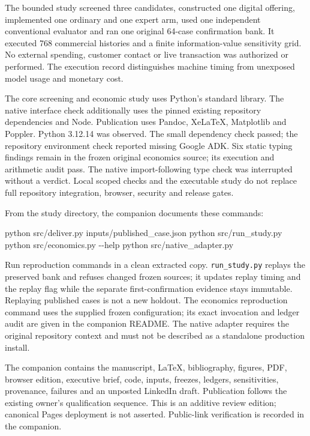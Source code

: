 \documentclass[
  11pt,
  letterpaper,
]{article}
\newenvironment{Shaded}{}{}
\newcommand{\AttributeTok}[1]{\textcolor[rgb]{0.49,0.56,0.16}{#1}}
\newcommand{\ExtensionTok}[1]{#1}
\newcommand{\NormalTok}[1]{#1}
\begin{document}
The bounded study screened three candidates, constructed one digital
offering, implemented one ordinary and one expert arm, used one
independent conventional evaluator and ran one original 64-case
confirmation bank. It executed 768 commercial histories and a finite
information-value sensitivity grid. No external spending, customer
contact or live transaction was authorized or performed. The execution
record distinguishes machine timing from unexposed model usage and
monetary cost.

The core screening and economic study uses Python's standard library.
The native interface check additionally uses the pinned existing
repository dependencies and Node. Publication uses Pandoc, XeLaTeX,
Matplotlib and Poppler. Python 3.12.14 was observed. The small
dependency check passed; the repository environment check reported
missing Google ADK. Six static typing findings remain in the frozen
original economics source; its execution and arithmetic audit pass. The
native import-following type check was interrupted without a verdict.
Local scoped checks and the executable study do not replace full
repository integration, browser, security and release gates.

From the study directory, the companion documents these commands:

\begin{Shaded}
\begin{Highlighting}[]
\ExtensionTok{python}\NormalTok{ src/deliver.py inputs/published\_case.json}
\ExtensionTok{python}\NormalTok{ src/run\_study.py}
\ExtensionTok{python}\NormalTok{ src/economics.py }\AttributeTok{{-}{-}help}
\ExtensionTok{python}\NormalTok{ src/native\_adapter.py}
\end{Highlighting}
\end{Shaded}

Run reproduction commands in a clean extracted copy.
\texttt{run\_study.py} replays the preserved bank and refuses changed
frozen sources; it updates replay timing and the replay flag while the
separate first-confirmation evidence stays immutable. Replaying
published cases is not a new holdout. The economics reproduction command
uses the supplied frozen configuration; its exact invocation and ledger
audit are given in the companion README. The native adapter requires the
original repository context and must not be described as a standalone
production install.

The companion contains the manuscript, LaTeX, bibliography, figures,
PDF, browser edition, executive brief, code, inputs, freezes, ledgers,
sensitivities, provenance, failures and an unposted LinkedIn draft.
Publication follows the existing owner's qualification sequence. This is
an additive review edition; canonical Pages deployment is not asserted.
Public-link verification is recorded in the companion.
\end{document}
